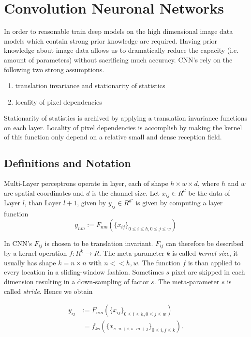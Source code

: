 \section{Convolution Neuronal Networks}\label{sec:cnn}

In order to reasonable train deep models on the high dimensional image data models which contain strong prior knowledge are required. Having prior knowledge about image data allows us to dramatically reduce the capacity (i.e. amount of parameters) without sacrificing much accuracy. CNN's rely on the following two strong assumptions.

\begin{enumerate}
    \item translation invariance and stationarity of statistics
	\item locality of pixel dependencies
\end{enumerate}

Stationarity of statistics is archived by applying a translation invariance functions on each layer. Locality of pixel dependencies is accomplish by making the kernel of this function only depend on a relative small and dense reception field. 

\subsection{Definitions and Notation} \label{sec:cnn_not}

Multi-Layer perceptrons operate in layer, each of shape $h \times w \times d$, where $h$ and $w$ are spatial coordinates and $d$ is the channel size. Let $x_{ij} \in R^d$ be the data of Layer $l$, than Layer $l+1$, given by $y_{ij} \in R^{d'}$ is given by computing a layer function 
\begin{equation*}
y_{nm} := F_{nm} (\{ x_{ij} \}_{0 \leq i \leq h, 0 \leq j \leq w}   )
\end{equation*}

In CNN's $F_{ij}$ is chosen to be translation invariant. $F_{ij}$ can therefore be described by a kernel  operation $f: R^k \rightarrow R$. The meta-parameter $k$ is called \emph{kernel size}, it usually has shape $k = n \times n$ with $n << h,w$.  The function $f$ is than applied to every location in a sliding-window fashion. Sometimes $s$ pixel are skipped in each dimension resulting in a down-sampling of factor $s$. The meta-parameter $s$ is called \emph{stride}. Hence we obtain

\begin{align*}
y_{ij} &:= F_{nm} (\{ x_{ij} \}_{0 \leq i \leq h, 0 \leq j \leq w}   ) \\&\; = f_{ks} (\{x_{s \cdot n + i, s \cdot m + j}  \}_{0 \leq i,j \leq k} ).
\end{align*}

